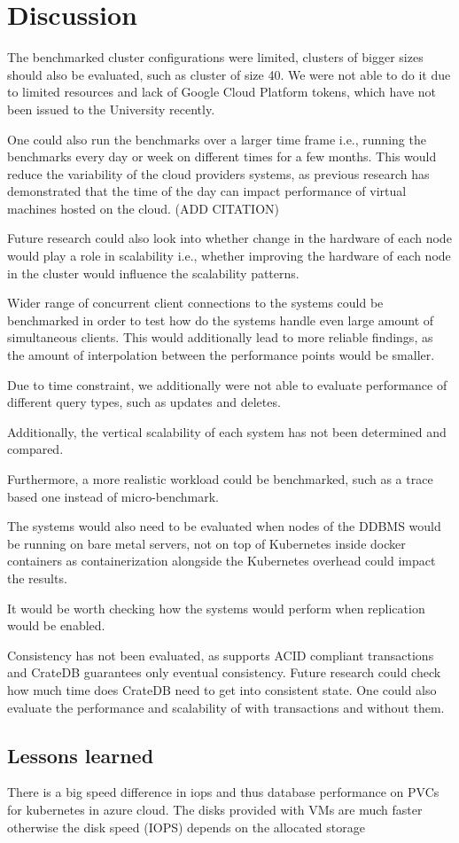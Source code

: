 \section{Discussion}
\label{cha:discussion}

The benchmarked cluster configurations were limited, clusters of bigger sizes should also be evaluated, such as cluster of size 40.
We were not able to do it due to limited resources and lack of Google Cloud Platform tokens, which have not been issued to the University recently.

One could also run the benchmarks over a larger time frame i.e., running the benchmarks every day or week on different times for a few months.
This would reduce the variability of the cloud providers systems, as previous research has demonstrated that the time of the day can impact performance of virtual machines hosted on the cloud. (ADD CITATION)

Future research could also look into whether change in the hardware of each node would play a role in scalability i.e., whether improving the hardware of each node in the cluster would influence the scalability patterns.

Wider range of concurrent client connections to the systems could be benchmarked in order to test how do the systems handle even large amount of simultaneous clients.
This would additionally lead to more reliable findings, as the amount of interpolation between the performance points would be smaller.

Due to time constraint, we additionally were not able to evaluate performance of different query types, such as updates and deletes.

Additionally, the vertical scalability of each system has not been determined and compared.

Furthermore, a more realistic workload could be benchmarked, such as a trace based one instead of micro-benchmark.

The systems would also need to be evaluated when nodes of the DDBMS would be running on bare metal servers, not on top of Kubernetes inside docker containers as containerization alongside the Kubernetes overhead could impact the results.

It would be worth checking how the systems would perform when replication would be enabled.

Consistency has not been evaluated, as \mobilitydbc supports ACID compliant transactions and CrateDB guarantees only eventual consistency.
Future research could check how much time does CrateDB need to get into consistent state.
One could also evaluate the performance and scalability of \mobilitydbc with transactions and without them.

\subsection{Lessons learned}

There is a big speed difference in iops and thus database performance on PVCs for kubernetes in azure cloud.
The disks provided with VMs are much faster otherwise the disk speed (IOPS) depends on the allocated storage
